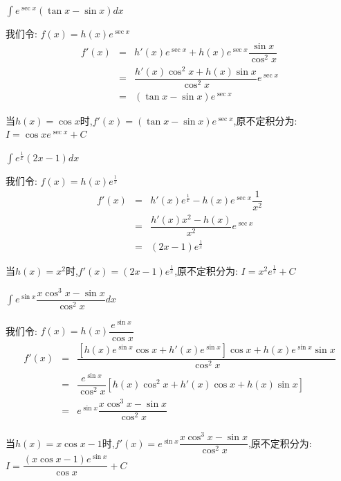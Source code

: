 \begin{proposition}
	$\int e^{\sec x}(\tan x-\sin x)dx$
\end{proposition}
\begin{solution}
		
	我们令:  $f(x)=h(x)e^{\sec x}$
	\begin{eqnarray*}
		f'(x)&=&h'(x)e^{\sec x}+h(x)e^{\sec x}\dfrac{\sin x}{\cos^2x}\\
		&=&\dfrac{h'(x)\cos^2x+h(x)\sin x}{\cos^2x}e^{\sec x}\\
		&=&(\tan x-\sin x)e^{\sec x}
	\end{eqnarray*}
	
	当$h(x)=\cos x$时,$f'(x)=(\tan x-\sin x)e^{\sec x}$,原不定积分为:  $I=\cos xe^{\sec x}+C$
\end{solution}
\begin{proposition}
	$\int e^{\frac{1}{x}}(2x-1)dx$
\end{proposition}
\begin{solution}
		
	我们令:  $f(x)=h(x)e^{\frac{1}{x}}$
	\begin{eqnarray*}
		f'(x)&=&h'(x)e^{\frac{1}{x}}-h(x)e^{\sec x}\dfrac{1}{x^2}\\
		&=&\dfrac{h'(x)x^2-h(x)}{x^2}e^{\sec x}\\
		&=&(2x-1)e^{\frac{1}{x}}
	\end{eqnarray*}
	
	当$h(x)=x^2$时,$f'(x)=(2x-1)e^{\frac{1}{x}}$,原不定积分为:  $I=x^2e^{\frac{1}{x}}+C$
\end{solution}
\begin{proposition}
	$\int e^{\sin x}\dfrac{x\cos^3 x-\sin x}{\cos^2x}dx$
\end{proposition}
\begin{solution}
		
	我们令:  $f(x)=h(x)\dfrac{e^{\sin x}}{\cos x}$
	\begin{eqnarray*}
		f'(x)&=&\dfrac{\left[h(x)e^{\sin x}\cos x+h'(x)e^{\sin x}\right]\cos x+h(x)e^{\sin x}\sin x }{\cos^2 x}\\
		&=&\dfrac{e^{\sin x}}{\cos^2 x}\left[ h(x)\cos^2 x+h'(x)\cos x+h(x)\sin x\right] \\
		&=&e^{\sin x}\dfrac{x\cos^3 x-\sin x}{\cos^2x}
	\end{eqnarray*}
	
	当$h(x)=x\cos x-1$时,$f'(x)=e^{\sin x}\dfrac{x\cos^3 x-\sin x}{\cos^2x}$,原不定积分为:  $I=\dfrac{(x\cos x-1)e^{\sin x}}{\cos x}+C$
\end{solution}
